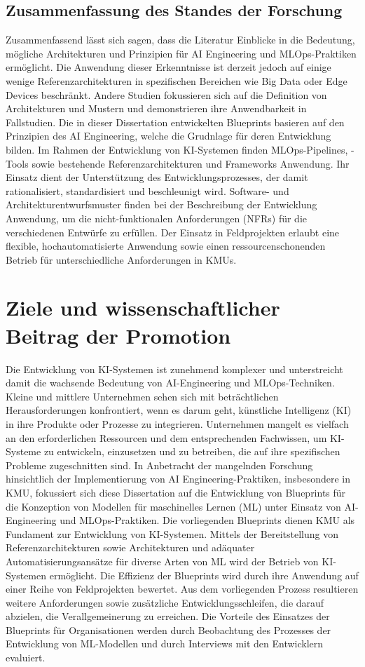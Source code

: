 \documentclass[11pt,a4paper,pointlessnumbers]{scrartcl}
\theoremstyle{break}
\numberwithin{equation}{section}
\begin{document}
\subsection{Zusammenfassung des Standes der Forschung}
Zusammenfassend lässt sich sagen, dass die Literatur Einblicke in die Bedeutung, mögliche Architekturen und Prinzipien für AI Engineering und MLOps-Praktiken ermöglicht. Die Anwendung dieser Erkenntnisse ist derzeit jedoch auf einige wenige Referenzarchitekturen in spezifischen Bereichen wie Big Data oder Edge Devices beschränkt. Andere Studien fokussieren sich auf die Definition von Architekturen und Mustern und demonstrieren ihre Anwendbarkeit in Fallstudien. Die in dieser Dissertation entwickelten Blueprints basieren auf den Prinzipien des AI Engineering, welche die Grudnlage für deren Entwicklung bilden. Im Rahmen der Entwicklung von KI-Systemen finden MLOps-Pipelines, -Tools sowie bestehende Referenzarchitekturen und Frameworks Anwendung. Ihr Einsatz dient der Unterstützung des Entwicklungsprozesses, der damit rationalisiert, standardisiert und beschleunigt wird. 
Software- und Architekturentwurfsmuster finden bei der Beschreibung der Entwicklung Anwendung, um die nicht-funktionalen Anforderungen (NFRs) für die verschiedenen Entwürfe zu erfüllen. Der Einsatz in Feldprojekten erlaubt eine flexible, hochautomatisierte Anwendung sowie einen ressourcenschonenden Betrieb für unterschiedliche Anforderungen in KMUs.

\section{Ziele und wissenschaftlicher Beitrag der Promotion}
Die Entwicklung von KI-Systemen ist zunehmend komplexer und unterstreicht damit die wachsende Bedeutung von AI-Engineering und MLOps-Techniken. Kleine und mittlere Unternehmen sehen sich mit beträchtlichen Herausforderungen konfrontiert, wenn es darum geht, künstliche Intelligenz (KI) in ihre Produkte oder Prozesse zu integrieren. Unternehmen mangelt es vielfach an den erforderlichen Ressourcen und dem entsprechenden Fachwissen, um KI-Systeme zu entwickeln, einzusetzen und zu betreiben, die auf ihre spezifischen Probleme zugeschnitten sind. In Anbetracht der mangelnden Forschung hinsichtlich der Implementierung von AI Engineering-Praktiken, insbesondere in KMU, fokussiert sich diese Dissertation auf die Entwicklung von Blueprints für die Konzeption von Modellen für maschinelles Lernen (ML) unter Einsatz von AI-Engineering und MLOps-Praktiken. Die vorliegenden Blueprints dienen KMU als Fundament zur Entwicklung von KI-Systemen. Mittels der Bereitstellung von Referenzarchitekturen sowie Architekturen und adäquater Automatisierungsansätze für diverse Arten von ML wird der Betrieb von KI-Systemen ermöglicht. Die Effizienz der Blueprints wird durch ihre Anwendung auf einer Reihe von Feldprojekten bewertet. Aus dem vorliegenden Prozess resultieren weitere Anforderungen sowie zusätzliche Entwicklungsschleifen, die darauf abzielen, die Verallgemeinerung zu erreichen. Die Vorteile des Einsatzes der Blueprints für Organisationen werden durch Beobachtung des Prozesses der Entwicklung von ML-Modellen und durch Interviews mit den Entwicklern evaluiert. 
\end{document}
